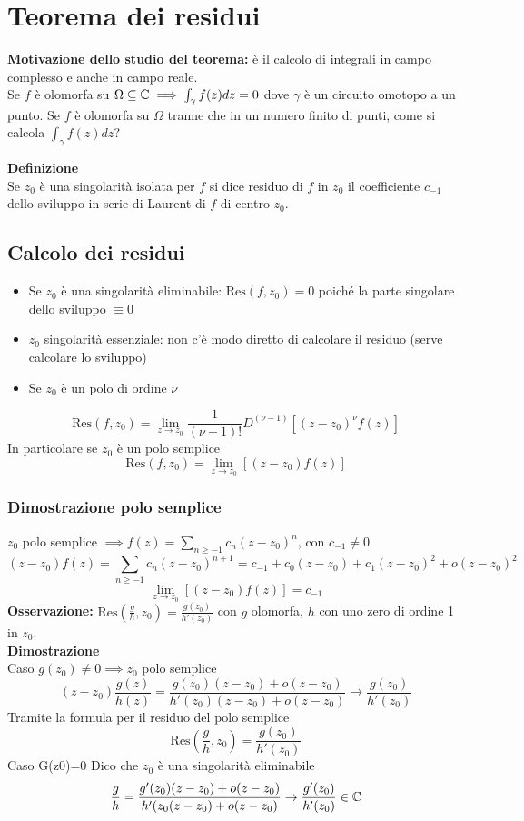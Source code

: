 
\section{Teorema dei residui}
\textbf{Motivazione dello studio del teorema: }è il calcolo di integrali in campo complesso e anche in campo reale.
\\Se $f$ è olomorfa su $\Omega \subseteq  \mathbb{C} \implies \int_{\gamma}^{} f(z)dz=0$ dove $\gamma$ è un circuito omotopo a un punto.
Se $f$ è olomorfa su $\Omega$ tranne che in un numero finito di punti, come si calcola $\int_{\gamma}^{} f(z)dz$?
\begin{tcolorbox}
	\textbf{Definizione}\\ 
	Se $z_0$ è una singolarità isolata per $f$ si dice residuo di $f$ in $z_0$ il coefficiente $c_{-1}$ dello sviluppo in serie di Laurent di $f$ di centro $z_0$.
\end{tcolorbox}
\subsection{Calcolo dei residui}
\begin{itemize}
	\item Se $z_0$ è una singolarità eliminabile: $\text{Res}(f,z_0)=0$ poiché la parte singolare dello sviluppo $\equiv 0$
	\item $z_0$ singolarità essenziale: non c'è modo diretto di calcolare il residuo (serve calcolare lo sviluppo)
	\item Se $z_0$ è un polo di ordine $\nu$
\end{itemize}
\[\text{Res}(f,z_0)=\lim_{z \to z_0} \frac{1}{(\nu-1)!}D^{(\nu-1)}[(z-z_0)^\nu f(z)]\]
In particolare se $z_0$ è un polo semplice
\[\text{Res}(f,z_0)=\lim_{z \to z_0} [(z-z_0)f(z)]\]
\subsubsection*{Dimostrazione polo semplice}
$z_0$ polo semplice $\implies f(z)=\sum_{n\ge -1}^{} c_n(z-z_0)^n$, con $c_{-1}\neq  0$
\[(z-z_0)f(z)=\sum_{n\ge -1}^{} c_n(z-z_0)^{n+1}=c_{-1}+c_0(z-z_0)+c_1(z-z_0)^2+o(z-z_0)^2\]
\[\lim_{z \to z_0} [(z-z_0)f(z)]=c_{-1}\]
\textbf{Osservazione:} $\text{Res}(\frac{g}{h},z_0)=\frac{g(z_0)}{h'(z_0)}$ con $g$ olomorfa, $h$ con uno zero di ordine 1 in $z_0$.\\
\textbf{Dimostrazione}\\
Caso $g(z_0)\neq 0\implies z_0$ polo semplice 
\[(z-z_0) \frac{g(z)}{h(z)}= \frac{g(z_0)(z-z_0)+o(z-z_0)}{h'(z_0)(z-z_0)+o(z-z_0)}\to  \frac{g(z_0)}{h'(z_0)}\]
Tramite la formula per il residuo del polo semplice
\[\text{Res}( \frac{g}{h},z_0)= \frac{g(z_0)}{h'(z_0)}\]
Caso G(z0)=0
Dico che $z_0$ è una singolarità eliminabile
\[\frac{g}{h}= \frac{g'(z_0)(z-z_0)+o(z-z_0)}{h'(z_0(z-z_0)+o(z-z_0)}\to \frac{g'(z_0)}{h'(z_0)}\in\mathbb{C}\]
